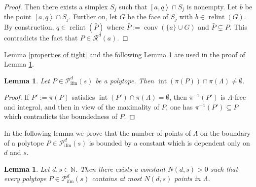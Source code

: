 \documentclass[a4paper]{article}
\theoremstyle{plain}
\newtheorem{lemma}[nn]{Lemma}
\begin{document}
\begin{proof}
Then there exists a simplex $S_j$ such that ${\left[{a,q}\right>} \cap
S_j$ is nonempty.
Let $b$ be the point ${\left[{a,q}\right>} \cap S_j$.
Further on, let $G$ be the face of $S_j$ with $b \in
{{\mathop{\mathrm{{relint}}}}}(G)$.
By construction, $q \in {{\mathop{\mathrm{{relint}}}}}(\bar{P})$ where $\bar{P} :=
{{\mathop{\mathrm{{conv}}}}} (\{a\} \cup G)$ and $\bar{P} \varsubsetneq P$.
This contradicts the fact that $P \in {\mathcal{R}}^d(a)$.
\end{proof}

Lemma \ref{properties of tight} and the following Lemma
\ref{projection non-free} are used in the proof of Lemma
\ref{G bound}.

\begin{lemma} \label{projection non-free}
Let $P \in {{\mathcal{P}}_{{\mathop{\mathrm{{ifm}}}}}^{{d}}({s})}$ be a polytope.
Then ${{\mathop{\mathrm{{int}}}}}(\pi(P)) \cap \pi(\Lambda) \ne \emptyset$.
\end{lemma}

\begin{proof}
If $P' := \pi(P)$ satisfies ${{\mathop{\mathrm{{int}}}}}(P') \cap \pi(\Lambda) =
\emptyset$, then $\pi^{-1}(P')$ is $\Lambda$-free and
integral, and then in view of the maximality of $P$, one has
$\pi^{-1}(P') \subseteq P$ which contradicts the boundedness
of $P$.
\end{proof}

In the following lemma we prove that the number of points of
$\Lambda$ on the boundary of a polytope $P \in {{\mathcal{P}}_{{\mathop{\mathrm{{ifm}}}}}^{{d}}({s})}$
is bounded by a constant which is dependent only on $d$ and
$s$.

\begin{lemma} \label{G bound}
Let $d,s \in {\mathbb{N}}$.
Then there exists a constant $N(d,s) > 0$ such that every
polytope $P \in {{\mathcal{P}}_{{\mathop{\mathrm{{ifm}}}}}^{{d}}({s})}$ contains at most $N(d,s)$
points in $\Lambda$.
\end{lemma}
\end{document}
